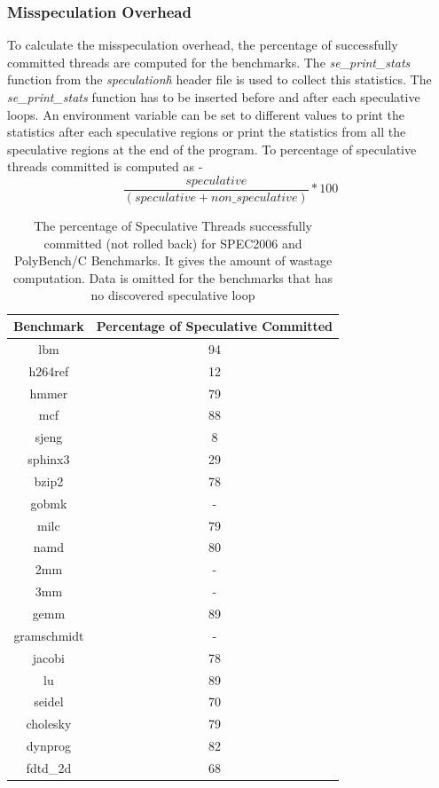 \documentclass[10pt]{report}          %
\begin{document}
\subsubsection{Misspeculation Overhead}

To calculate the misspeculation overhead, the percentage of successfully committed threads are computed for the benchmarks.  The \textit{se\_print\_stats} function from the \textit{speculation\.h} header file is used to collect this statistics.  The \textit{se\_print\_stats} function has to be inserted before and after each speculative loops.  An environment variable can be set to different values to print the statistics after each speculative regions or print the statistics from all the speculative regions at the end of the program.  To percentage of speculative threads committed is computed as -
\begin{equation}
 \frac{speculative }{\left ( speculative + non\_speculative \right )}\ast 100
\end{equation}

\begin{table}[h]
\centering
\caption{The percentage of Speculative Threads successfully committed (not rolled back) for SPEC2006 and PolyBench/C Benchmarks.  It gives the amount of wastage computation. Data is omitted for the benchmarks that has no discovered speculative loop }
\begin{tabular}{|c||c|} \hline
Benchmark &Percentage of Speculative Committed\\ \hline 
lbm &  94\\ \hline
h264ref & 12  \\ \hline
hmmer &	79	  \\ \hline
mcf & 88 \\ \hline
sjeng &	8 \\ \hline
sphinx3 & 29  \\ \hline
bzip2 & 78  \\ \hline
gobmk & -  \\ \hline
milc & 79  \\ \hline
namd & 80  \\ \hline
2mm	& - \\ \hline
3mm	& - \\ \hline
gemm	 & 89 \\ \hline
gramschmidt	& - \\ \hline
jacobi & 78 \\ \hline
lu	& 89 \\ \hline
seidel&	70 \\ \hline
cholesky & 79 \\ \hline
dynprog & 82 \\ \hline
fdtd\_2d & 68 \\ \hline
\hline\end{tabular}
\label{table:spec_committed}
\end{table}
\end{document}
